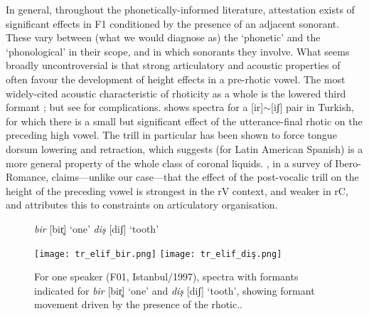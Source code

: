 In general, throughout the phonetically-informed literature, attestation exists of significant effects in F1 conditioned by the presence of an adjacent sonorant. These vary between (what we would diagnose as) the `phonetic' and the `phonological' in their scope, and in which sonorants they involve. What seems broadly uncontroversial is that strong articulatory and acoustic properties of  often favour the development of height effects in a pre-rhotic vowel. The most widely-cited acoustic characteristic of rhoticity as a whole is the lowered third formant \citep{Ladefoged2003}; but see \citet{Lindau1985} for complications.  shows spectra for a [ir]$\sim$[iʃ] pair in Turkish, for which there is a small but significant effect of the utterance-final rhotic on the preceding high vowel. The trill in particular \citep{Recasens1991,Recasens1999,Sole2002} has been shown to force tongue dorsum lowering and retraction, which \citet{Proctor2009} suggests (for Latin American Spanish) is a more general property of the whole class of coronal liquids. \citet{Bradley2010}, in a survey of Ibero-Romance, claims---unlike our case---that the effect of the post-vocalic trill on the height of the preceding vowel is strongest in the \textunderscore rV context, and weaker in \textunderscore rC, and attributes this to constraints on articulatory organisation.

\begin{figure}[h]
  \centering

  { \textit{bir} [bir̥] `one' \hfill \textit{diş} [diʃ] `tooth' }

  \texttt{[image: tr\_elif\_bir.png]}\hfill
  \texttt{[image: tr\_elif\_diş.png]}
  \caption[Spectrum for \textit{bir} `one' and \textit{diş} `tooth'.]{For one speaker (F01, Istanbul/1997), spectra with formants indicated for \emph{bir} [bir̥] `one' and \textit{diş} [diʃ] `tooth', showing formant movement driven by the presence of the rhotic.\footnotemark.}
  \label{fig:tr_rhotic_spectrum}
\end{figure}


